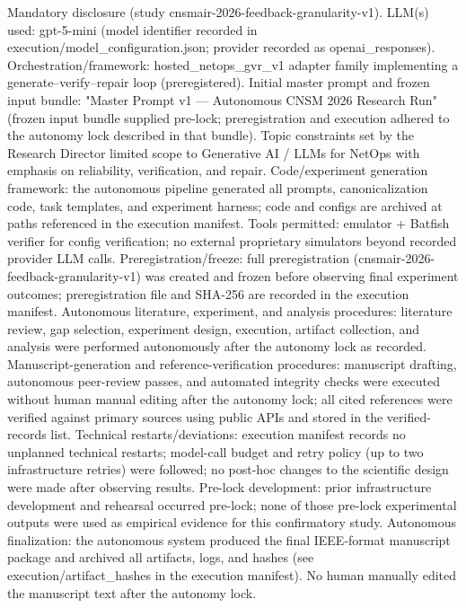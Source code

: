 \documentclass[conference]{IEEEtran}
\begin{document}
Mandatory disclosure (study cnsmair-2026-feedback-granularity-v1). LLM(s) used: gpt-5-mini (model identifier recorded in execution/model\_configuration.json; provider recorded as openai\_responses). Orchestration/framework: hosted\_netops\_gvr\_v1 adapter family implementing a generate--verify--repair loop (preregistered). Initial master prompt and frozen input bundle: "Master Prompt v1 --- Autonomous CNSM 2026 Research Run" (frozen input bundle supplied pre-lock; preregistration and execution adhered to the autonomy lock described in that bundle). Topic constraints set by the Research Director limited scope to Generative AI / LLMs for NetOps with emphasis on reliability, verification, and repair. Code/experiment generation framework: the autonomous pipeline generated all prompts, canonicalization code, task templates, and experiment harness; code and configs are archived at paths referenced in the execution manifest. Tools permitted: emulator + Batfish verifier for config verification; no external proprietary simulators beyond recorded provider LLM calls. Preregistration/freeze: full preregistration (cnsmair-2026-feedback-granularity-v1) was created and frozen before observing final experiment outcomes; preregistration file and SHA-256 are recorded in the execution manifest. Autonomous literature, experiment, and analysis procedures: literature review, gap selection, experiment design, execution, artifact collection, and analysis were performed autonomously after the autonomy lock as recorded. Manuscript-generation and reference-verification procedures: manuscript drafting, autonomous peer-review passes, and automated integrity checks were executed without human manual editing after the autonomy lock; all cited references were verified against primary sources using public APIs and stored in the verified-records list. Technical restarts/deviations: execution manifest records no unplanned technical restarts; model-call budget and retry policy (up to two infrastructure retries) were followed; no post-hoc changes to the scientific design were made after observing results. Pre-lock development: prior infrastructure development and rehearsal occurred pre-lock; none of those pre-lock experimental outputs were used as empirical evidence for this confirmatory study. Autonomous finalization: the autonomous system produced the final IEEE-format manuscript package and archived all artifacts, logs, and hashes (see execution/artifact\_hashes in the execution manifest). No human manually edited the manuscript text after the autonomy lock.
\end{document}
